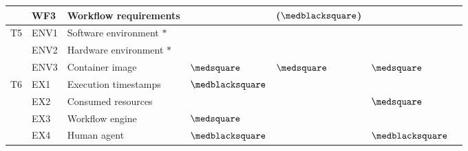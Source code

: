 \begin{table*}[ht!]
\begin{tabularx}{\linewidth}{l l L l l l l}
    & WF3   & Workflow requirements             & ~ & ($\medblacksquare$) & ~    \\
\midrule
T5  & ENV1  & Software environment $\ast$       & ~ & ~  & ~ \\
    & ENV2  & Hardware environment $\ast$       & ~ & ~  & ~ \\
    & ENV3  & Container image                   & $\medsquare$ & $\medsquare$ & $\medsquare$\\
\midrule
T6  & EX1   & Execution timestamps              &  $\medblacksquare$ & ~ & ~ \\
    & EX2   & Consumed resources                &  ~ & ~ & $\medsquare$ \\
    & EX3   & Workflow engine                   &  $\medsquare$ & ~ & ~    \\
    & EX4   & Human agent                       & $\medblacksquare$ & ~ & $\medblacksquare$     \\
\bottomrule
\end{tabularx}


\end{table*}
